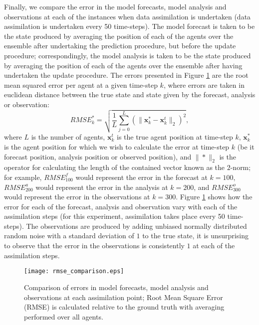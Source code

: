 Finally, we compare the error in the model forecasts, model analysis and
observations at each of the instances when data assimilation is undertaken (data
assimilation is undertaken every 50 time-steps).
The model forecast is taken to be the state produced by averaging the position
of each of the agents over the ensemble after undertaking the prediction
procedure, but before the update procedure; correspondingly, the model analysis
is taken to be the state produced by averaging the position of each of the
agents over the ensemble after having undertaken the update procedure.
The errors presented in Figure \ref{fig:rmse_comparison} are the root mean
squared error per agent at a given time-step $k$, where errors are taken in
euclidean distance between the true state and state given by the forecast,
analysis or observation:
\begin{equation}
    RMSE_{k}^{*} = \sqrt{\frac{1}{L} \sum_{j=0}^{L}
                    \left(
                    \| \mathbf{x}_{k}^{*} - \mathbf{x}_{k}^{t} \|_{2}
                    \right) ^ 2},
\end{equation}
where $L$ is the number of agents, $\mathbf{x}_{k}^t$ is the true agent position
at time-step $k$, $\mathbf{x}_{k}^{*}$ is the agent position for which we wish
to calculate the error at time-step $k$ (be it forecast position, analysis
position or observed position), and $\| * \|_2$ is the operator for calculating
the length of the contained vector known as the $2$-norm; for example,
$RMSE_{100}^{f}$ would represent the error in the forecast at $k=100$,
$RMSE_{200}^{a}$ would represent the error in the analysis at $k=200$, and
$RMSE_{300}^{o}$ would represent the error in the observations at $k=300$.
Figure \ref{fig:rmse_comparison} shows how the error for each of the forecast,
analysis and observation vary with each of the assimilation steps (for this
experiment, assimilation takes place every 50 time-steps).
The observations are produced by adding unbiased normally distributed random
noise with a standard deviation of $1$ to the true state, it is unsurprising to
observe that the error in the observations is consistently $1$ at each of the
assimilation steps.

\begin{figure}[h!]
    \centering
    \texttt{[image: rmse\_comparison.eps]}
    \caption[Comparison of errors in model forecasts, model analysis and
    observations at each assimilation point.]{\centering Comparison of errors in
    model forecasts, model analysis and observations at each assimilation point;
    Root Mean Square Error (RMSE) is calculated relative to the ground truth
    with averaging performed over all agents.}\label{fig:rmse_comparison}
\end{figure}

